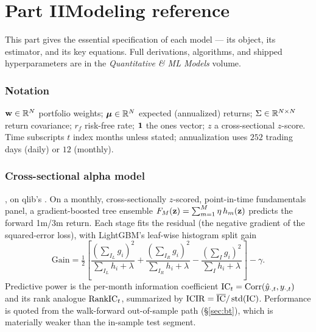 \documentclass[11pt]{article}
\begin{document}
\clearpage
\part*{Part II\quad Modeling reference}

This part gives the essential specification of each model --- its object, its
estimator, and its key equations. Full derivations, algorithms, and shipped
hyperparameters are in the \emph{Quantitative \& ML Models} volume.

\section{Notation}
$\mathbf{w}\in\mathbb{R}^N$ portfolio weights; $\boldsymbol{\mu}\in\mathbb{R}^N$ expected (annualized) returns;
$\Sigma\in\mathbb{R}^{N\times N}$ return covariance; $r_f$ risk-free rate; $\mathbf{1}$ the ones
vector; $z$ a cross-sectional $z$-score. Time subscripts $t$ index months unless
stated; annualization uses $252$ trading days (daily) or $12$ (monthly).

\section{Cross-sectional alpha model}
\label{sec:alpha}
, on qlib's . On a monthly,
cross-sectionally $z$-scored, point-in-time fundamentals panel, a gradient-boosted
tree ensemble $F_M(\mathbf{z})=\sum_{m=1}^{M}\eta\,h_m(\mathbf{z})$ predicts the forward 1m/3m
return. Each stage fits the residual (the negative gradient of the squared-error
loss), with LightGBM's leaf-wise histogram split gain
\begin{equation}
  \text{Gain}=\tfrac12\!\left[
  \frac{(\sum_{I_L}g_i)^2}{\sum_{I_L}h_i+\lambda}
  +\frac{(\sum_{I_R}g_i)^2}{\sum_{I_R}h_i+\lambda}
  -\frac{(\sum_{I}g_i)^2}{\sum_{I}h_i+\lambda}\right]-\gamma .
\end{equation}
Predictive power is the per-month information coefficient
$\mathrm{IC}_t=\operatorname{Corr}(\hat y_{\cdot,t},y_{\cdot,t})$ and its rank analogue $\mathrm{RankIC}_t$,
summarized by $\mathrm{ICIR}=\overline{\mathrm{IC}}/\operatorname{std}(\mathrm{IC})$. Performance is quoted from
the walk-forward out-of-sample path (\S\ref{sec:bt}), which is materially weaker
than the in-sample test segment.
\end{document}
